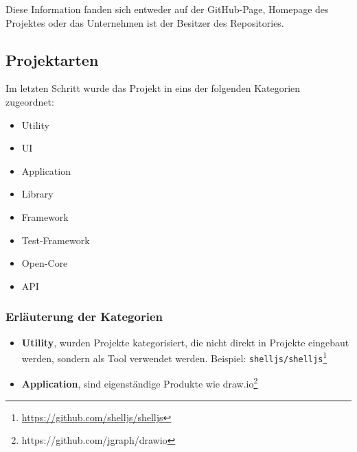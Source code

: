 \noindent
Diese Information fanden sich entweder auf der GitHub-Page, Homepage des Projektes oder das Unternehmen
ist der Besitzer des Repositories.



\subsection{Projektarten}
Im letzten Schritt wurde das Projekt in eins der folgenden Kategorien zugeordnet: \\

\begin{multicols}{2}
    \begin{itemize}
        \setlength\itemsep{0em}
        \item Utility
        \item UI
        \item Application
        \item Library
        \item Framework
        \item Test-Framework
        \item Open-Core
        \item API
    \end{itemize}
\end{multicols}

\subsubsection*{Erläuterung der Kategorien}

\begin{itemize}
    \setlength\itemsep{0em}
    \item \textbf{Utility}, wurden Projekte kategorisiert, die nicht direkt in Projekte eingebaut
          werden, sondern als Tool verwendet werden. Beispiel: \texttt{shelljs/shelljs}\footnote{
              \url{https://github.com/shelljs/shelljs}}
    \item \textbf{Application}, sind eigenständige Produkte wie draw.io\footnote{
              https://github.com/jgraph/drawio}
\end{itemize}





\newpage %
